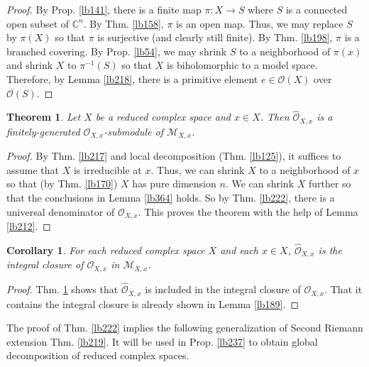 \documentclass[12pt,b5paper,notitlepage]{report}
\theoremstyle{definition}
\theoremstyle{plain}
\newtheorem{thm}[df]{Theorem}
\newtheorem{co}[df]{Corollary}
\newcommand{\scr}{\mathscr}
\newcommand{\Cbb}{\mathbb C}
\newcommand{\Owht}{\widehat{\scr O}}
\numberwithin{equation}{section}
\begin{document}
\begin{proof}
By Prop. \ref{lb141}, there is a finite map $\pi:X\rightarrow S$ where $S$ is a connected open subset of $\Cbb^n$. By Thm. \ref{lb158}, $\pi$ is an open map. Thus, we may replace $S$ by $\pi(X)$ so that $\pi$ is surjective (and clearly still finite). By Thm. \ref{lb198}, $\pi$ is a branched covering. By Prop. \ref{lb54}, we may shrink $S$ to a neighborhood of $\pi(x)$ and shrink $X$ to $\pi^{-1}(S)$ so that $X$ is biholomorphic to a model space. Therefore, by Lemma \ref{lb218}, there is a primitive element $e\in\scr O(X)$ over $\scr O(S)$.
\end{proof}









\begin{thm}\label{lb216}
Let $X$ be a reduced complex space and $x\in X$. Then $\Owht_{X,x}$ is a finitely-generated $\scr O_{X,x}$-submodule of $\scr M_{X,x}$. 
\end{thm}



\begin{proof}
By Thm. \ref{lb217} and local decomposition (Thm. \ref{lb125}), it suffices to assume that $X$ is irreducible at $x$. Thus, we can shrink $X$ to a neighborhood of $x$ so that (by Thm. \ref{lb170}) $X$ has pure dimension $n$. We can shrink $X$ further so that the conclusions in Lemma \ref{lb364} holds.  So by Thm. \ref{lb222}, there is a universal denominator of $\scr O_{X,x}$. This proves the theorem with the help of Lemma \ref{lb212}.
\end{proof}




\begin{co}\label{lb220}
For each reduced complex space $X$ and each $x\in X$, $\Owht_{X,x}$ is the integral closure of $\scr O_{X,x}$ in $\scr M_{X,x}$.
\end{co}




\begin{proof}
Thm. \ref{lb216} shows that $\Owht_{X,x}$ is included in the integral closure of $\scr O_{X,x}$. That it contains the integral closure is already shown in Lemma \ref{lb189}.
\end{proof}



The proof of Thm. \ref{lb222} implies the following generalization of Second Riemann extension Thm. \ref{lb219}. It will be used in Prop. \ref{lb237} to obtain global decomposition of reduced complex spaces.
\end{document}
